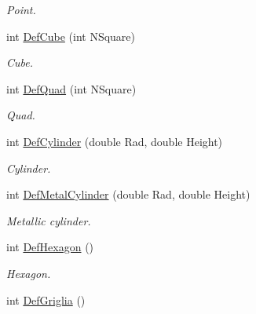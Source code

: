 \begin{DoxyCompactItemize}
\begin{DoxyCompactList}\small\item\em Point. \end{DoxyCompactList}\item 
int \hyperlink{classDraw_a0ab1b8899eb5e75e63634120f152d532}{Def\+Cube} (int N\+Square)\hypertarget{classDraw_a0ab1b8899eb5e75e63634120f152d532}{}\label{classDraw_a0ab1b8899eb5e75e63634120f152d532}

\begin{DoxyCompactList}\small\item\em Cube. \end{DoxyCompactList}\item 
int \hyperlink{classDraw_a7e12d94e8036fd5222db58072fe8a4c1}{Def\+Quad} (int N\+Square)\hypertarget{classDraw_a7e12d94e8036fd5222db58072fe8a4c1}{}\label{classDraw_a7e12d94e8036fd5222db58072fe8a4c1}

\begin{DoxyCompactList}\small\item\em Quad. \end{DoxyCompactList}\item 
int \hyperlink{classDraw_af4ca54f4f60c7e6b3e44f81a82afa810}{Def\+Cylinder} (double Rad, double Height)\hypertarget{classDraw_af4ca54f4f60c7e6b3e44f81a82afa810}{}\label{classDraw_af4ca54f4f60c7e6b3e44f81a82afa810}

\begin{DoxyCompactList}\small\item\em Cylinder. \end{DoxyCompactList}\item 
int \hyperlink{classDraw_a48bd0a016aeca0bc3c42ddfbe4597bdc}{Def\+Metal\+Cylinder} (double Rad, double Height)\hypertarget{classDraw_a48bd0a016aeca0bc3c42ddfbe4597bdc}{}\label{classDraw_a48bd0a016aeca0bc3c42ddfbe4597bdc}

\begin{DoxyCompactList}\small\item\em Metallic cylinder. \end{DoxyCompactList}\item 
int \hyperlink{classDraw_a57d5c994950e11fb7e58680393213343}{Def\+Hexagon} ()\hypertarget{classDraw_a57d5c994950e11fb7e58680393213343}{}\label{classDraw_a57d5c994950e11fb7e58680393213343}

\begin{DoxyCompactList}\small\item\em Hexagon. \end{DoxyCompactList}\item 
int \hyperlink{classDraw_adec17f3a83b10efe43dee2808cc57194}{Def\+Griglia} ()\hypertarget{classDraw_adec17f3a83b10efe43dee2808cc57194}{}\label{classDraw_adec17f3a83b10efe43dee2808cc57194}


\end{DoxyCompactItemize}
